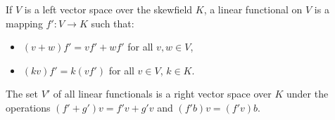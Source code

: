 If $V$ is a left vector space over the skewfield $K$, a linear functional on $V$ is a mapping $f': V \to K$ such that:
\begin{itemize}
\item[(i)] $(v + w)f' = vf' + wf'$ for all $v, w \in V$,
\item[(ii)] $(kv)f' = k(vf')$ for all $v \in V$, $k \in K$.
\end{itemize}
The set $V'$ of all linear functionals is a right vector space over $K$ under the operations $(f' + g')v = f'v + g'v$ and $(f'b)v = (f'v)b$.
